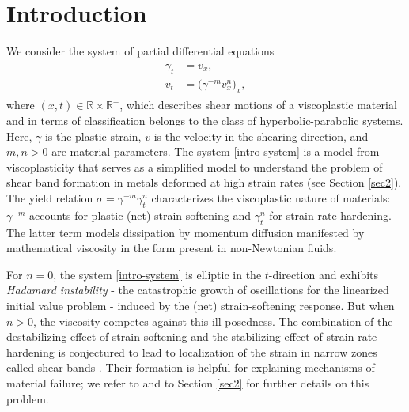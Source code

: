 \documentclass[a4paper,11pt]{article}
\numberwithin{step}{dummy}
\begin{document}
\section{Introduction} \label{sec:intro}
We consider  the system of partial differential equations
\begin{align}
 \begin{aligned}
 \gamma_t&= v_x, \\
 v_t &= \big( \gamma^{-m} v_x^n\big)_x,
 \end{aligned}\label{intro-system}
\end{align}
where $(x,t)\in \mathbb{R} \times \mathbb{R}^+$,
which describes shear motions of a viscoplastic material and in terms of classification 
belongs to the class of hyperbolic-parabolic systems.
Here, $\gamma$ is the plastic strain, $v$ is the velocity in the shearing direction,
and $m,n>0$ are material parameters. 
The system \eqref{intro-system} is a model from viscoplasticity that serves as a simplified model to understand the problem of 
shear band formation in metals deformed at high strain rates (see Section  \ref{sec2}).  
The yield relation $\sigma = \gamma^{-m} \gamma_t^n$ characterizes the viscoplastic nature of materials: 
$\gamma^{-m}$ accounts for plastic (net) strain softening and $\gamma_t^n$ for strain-rate hardening. The latter term models dissipation 
by momentum diffusion manifested by mathematical viscosity in the form present in non-Newtonian fluids. 

For $n=0$, the system \eqref{intro-system}  is elliptic in the $t$-direction and exhibits {\it Hadamard instability} - the catastrophic growth of oscillations for the linearized  
initial value problem - induced by the (net) strain-softening response.  But when $n>0$, the viscosity competes against this ill-posedness.  The combination
of the destabilizing effect of strain softening and the stabilizing effect of strain-rate hardening is conjectured to lead to localization of the strain in narrow zones  
called shear bands \cite{zener_effect_1944, clifton_rev_1990}. Their formation is helpful for explaining mechanisms of material failure;  we refer to
\cite{zener_effect_1944, clifton_critical_1984, shawki_shear_1989, clifton_rev_1990, wright_survey_2002, bertsch_effect_1991, tzavaras_nonlinear_1992}
and to Section  \ref{sec2} for further details on this problem.
\end{document}
